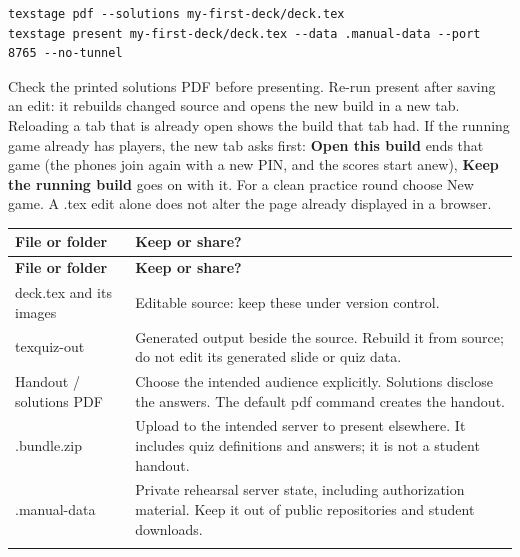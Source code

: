 \documentclass[a4paper,11pt]{article}
\begin{document}
\par\noindent\begin{minipage}{\linewidth}
\begin{Verbatim}
texstage pdf --solutions my-first-deck/deck.tex
texstage present my-first-deck/deck.tex --data .manual-data --port 8765 --no-tunnel
\end{Verbatim}
\end{minipage}\par\smallskip

Check the printed solutions PDF before presenting.\allowbreak{} Re-\allowbreak{}run present after saving an edit: it rebuilds changed source and opens the new build in a new tab.\allowbreak{} Reloading a tab that is already open shows the build that tab had.\allowbreak{} If the running game already has players, the new tab asks first: \textbf{Open this build} ends that game (the phones join again with a new PIN, and the scores start anew), \textbf{Keep the running build} goes on with it.\allowbreak{} For a clean practice round choose New game.\allowbreak{} A .\allowbreak{}tex edit alone does not alter the page already displayed in a browser.\par

{\small
\begin{longtable}{>{\raggedright\arraybackslash}p{}>{\raggedright\arraybackslash}p{}}
\toprule
\textbf{File or folder} & \textbf{Keep or share?} \\
\midrule
\endfirsthead
\toprule
\textbf{File or folder} & \textbf{Keep or share?} \\
\midrule
\endhead
\midrule
\endfoot
\bottomrule
\endlastfoot
deck.\allowbreak{}tex and its images & Editable source: keep these under version control. \\ \addlinespace[3pt]
texquiz-\allowbreak{}out & Generated output beside the source.\allowbreak{} Rebuild it from source; do not edit its generated slide or quiz data. \\ \addlinespace[3pt]
Handout /\allowbreak{} solutions PDF & Choose the intended audience explicitly.\allowbreak{} Solutions disclose the answers.\allowbreak{} The default pdf command creates the handout. \\ \addlinespace[3pt]
.\allowbreak{}bundle.\allowbreak{}zip & Upload to the intended server to present elsewhere.\allowbreak{} It includes quiz definitions and answers; it is not a student handout. \\ \addlinespace[3pt]
.\allowbreak{}manual-\allowbreak{}data & Private rehearsal server state, including authorization material.\allowbreak{} Keep it out of public repositories and student downloads. \\ \addlinespace[3pt]
\end{longtable}}
\end{document}
